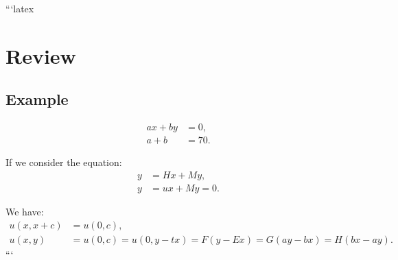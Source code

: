 ```latex
\section*{Review}

\subsection*{Example}

\begin{align}
    ax + by &= 0, \\
    a + b &= 70.
\end{align}

If we consider the equation:
\begin{align}
    y &= Hx + My, \\
    y &= ux + My = 0.
\end{align}

We have:
\begin{align}
    u(x, x + c) &= u(0, c), \\
    u(x, y) &= u(0, c) = u(0, y - tx) = F(y - Ex) = G(ay - bx) = H(bx - ay).
\end{align}
```
